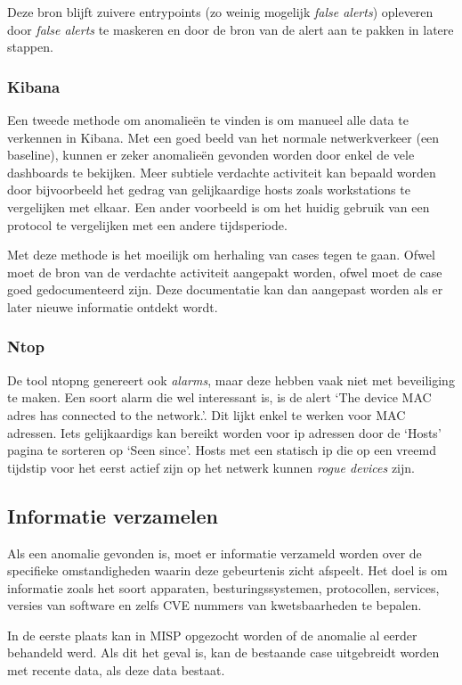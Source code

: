 \documentclass[a4paper, 12pt]{report}
\begin{document}
Deze bron blijft zuivere entrypoints (zo weinig mogelijk \emph{false alerts}) opleveren door \emph{false alerts} te maskeren en door de bron van de alert aan te pakken in latere stappen.

\subsubsection{Kibana}
Een tweede methode om anomalieën te vinden is om manueel alle data te verkennen in Kibana.
Met een goed beeld van het normale netwerkverkeer (een baseline), kunnen er zeker anomalieën gevonden worden door enkel de vele dashboards te bekijken.
Meer subtiele verdachte activiteit kan bepaald worden door bijvoorbeeld het gedrag van gelijkaardige hosts zoals workstations te vergelijken met elkaar.
Een ander voorbeeld is om het huidig gebruik van een protocol te vergelijken met een andere tijdsperiode.

Met deze methode is het moeilijk om herhaling van cases tegen te gaan.
Ofwel moet de bron van de verdachte activiteit aangepakt worden, ofwel moet de case goed gedocumenteerd zijn.
Deze documentatie kan dan aangepast worden als er later nieuwe informatie ontdekt wordt.

\subsubsection{Ntop}
De tool ntopng genereert ook \emph{alarms}, maar deze hebben vaak niet met beveiliging te maken.
Een soort alarm die wel interessant is, is de alert `The device {MAC adres} has connected to the network.'.
Dit lijkt enkel te werken voor MAC adressen.
Iets gelijkaardigs kan bereikt worden voor ip adressen door de `Hosts' pagina te sorteren op `Seen since'.
Hosts met een statisch ip die op een vreemd tijdstip voor het eerst actief zijn op het netwerk kunnen \emph{rogue devices} zijn.

\subsection{Informatie verzamelen}
Als een anomalie gevonden is, moet er informatie verzameld worden over de specifieke omstandigheden waarin deze gebeurtenis zicht afspeelt.
Het doel is om informatie zoals het soort apparaten, besturingssystemen, protocollen, services, versies van software en zelfs CVE nummers van kwetsbaarheden te bepalen.

In de eerste plaats kan in MISP opgezocht worden of de anomalie al eerder behandeld werd.
Als dit het geval is, kan de bestaande case uitgebreidt worden met recente data, als deze data bestaat.
\end{document}
